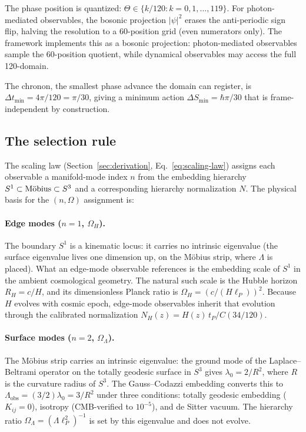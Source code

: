 \documentclass[11pt,a4paper]{article}
\numberwithin{equation}{section}
\numberwithin{table}{section}
\numberwithin{figure}{section}
\newcommand{\Mob}{\ifmmode\text{M\"obius}\else M\"obius\fi}
\newcommand{\Cval}[1]{C(#1/120)}
\begin{document}
The phase position is quantized:
$\Theta \in \{k/120 : k = 0, 1, \ldots, 119\}$. For photon-mediated
observables, the bosonic projection $|\psi|^2$ erases the
anti-periodic sign flip, halving the resolution to a 60-position grid
(even numerators only). The framework implements this as a bosonic
projection: photon-mediated observables sample the 60-position
quotient, while dynamical observables may access the full 120-domain.

The chronon, the smallest phase advance the domain can register, is
$\Delta t_\text{min} = 4\pi/120 = \pi/30$, giving a minimum action
$\Delta S_\text{min} = \hbar\pi/30$ that is frame-independent by
construction.

\subsection{The selection rule}
\label{app:selection}

The scaling law (Section~\ref{sec:derivation},
Eq.~\ref{eq:scaling-law}) assigns each observable a manifold-mode index
$n$ from the embedding hierarchy $S^1 \subset \Mob \subset S^3$ and a
corresponding hierarchy normalization $N$. The physical basis for the
$(n, \Omega)$ assignment is:

\paragraph{Edge modes ($n = 1$, $\Omega_H$).}
The boundary $S^1$ is a kinematic locus: it carries no intrinsic
eigenvalue (the surface eigenvalue lives one dimension up, on the
\Mob{} strip, where $\Lambda$ is placed). What an edge-mode observable
references is the embedding scale of $S^1$ in the ambient cosmological
geometry. The natural such scale is the Hubble horizon $R_H = c/H$, and
its dimensionless Planck ratio is $\Omega_H = (c/(H\ell_P))^2$. Because
$H$ evolves with cosmic epoch, edge-mode observables inherit that
evolution through the calibrated normalization
$N_H(z) = H(z)\,t_P/\Cval{34}$.

\paragraph{Surface modes ($n = 2$, $\Omega_\Lambda$).}
The \Mob{} strip carries an intrinsic eigenvalue: the ground mode of
the Laplace--Beltrami operator on the totally geodesic surface in $S^3$
gives $\lambda_0 = 2/R^2$, where $R$ is the curvature radius of $S^3$.
The Gauss--Codazzi embedding converts this to
$\Lambda_\text{obs} = (3/2)\lambda_0 = 3/R^2$ under three conditions:
totally geodesic embedding ($K_{ij} = 0$), isotropy (CMB-verified to
$10^{-5}$), and de Sitter vacuum. The hierarchy ratio
$\Omega_\Lambda = (\Lambda\ell_P^2)^{-1}$ is set by this eigenvalue and
does not evolve.
\end{document}
